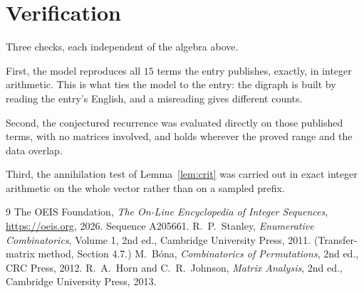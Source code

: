 \documentclass[11pt,a4paper]{article}
\theoremstyle{plain}
\theoremstyle{definition}
\begin{document}
\section{Verification}

Three checks, each independent of the algebra above.

First, the model reproduces all $15$ terms the entry publishes, exactly, in integer
arithmetic. This is what ties the model to the entry: the digraph is built by reading the
entry's English, and a misreading gives different counts.

Second, the conjectured recurrence was evaluated directly on those published terms, with no
matrices involved, and holds wherever the proved range and the data overlap.

Third, the annihilation test of Lemma~\ref{lem:crit} was carried out in exact integer
arithmetic on the whole vector rather than on a sampled prefix.

\begin{thebibliography}{9}
 The OEIS Foundation, \emph{The On-Line Encyclopedia of Integer
Sequences}, \url{https://oeis.org}, 2026. Sequence A205661.
 R.~P.~Stanley, \emph{Enumerative Combinatorics}, Volume 1, 2nd ed.,
Cambridge University Press, 2011. (Transfer-matrix method, Section 4.7.)
 M.~B\'ona, \emph{Combinatorics of Permutations}, 2nd ed., CRC
Press, 2012.
 R.~A.~Horn and C.~R.~Johnson, \emph{Matrix Analysis}, 2nd ed., Cambridge
University Press, 2013.
\end{thebibliography}
\end{document}
